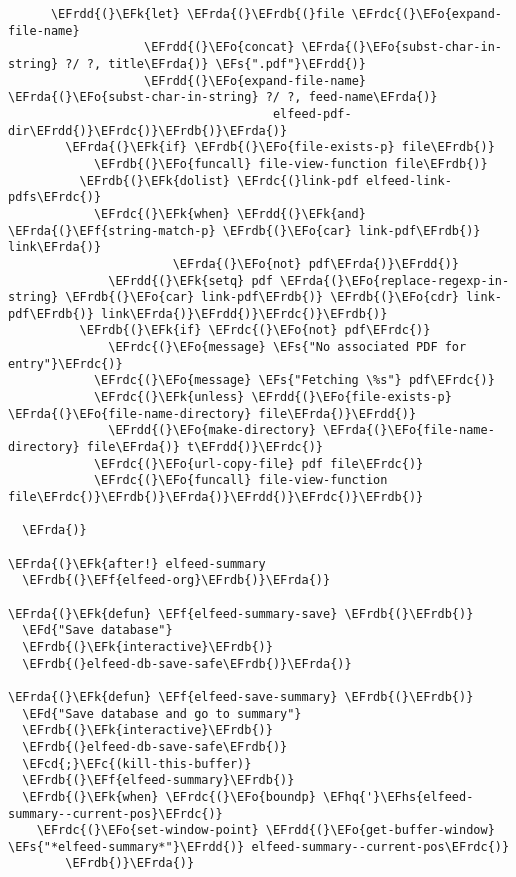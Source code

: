\documentclass[a4wide,10pt]{article}
\newcommand{\EFc}[1]{\textcolor{EFc}{#1}} %
\newcommand{\EFcd}[1]{\textcolor{EFcd}{#1}} %
\newcommand{\EFs}[1]{\textcolor{EFs}{#1}} %
\newcommand{\EFd}[1]{\textcolor{EFd}{#1}} %
\newcommand{\EFk}[1]{\textcolor{EFk}{#1}} %
\newcommand{\EFf}[1]{\textcolor{EFf}{#1}} %
\newcommand{\EFo}[1]{\textcolor{EFo}{#1}} %
\newcommand{\EFhq}[1]{\textcolor{EFhq}{#1}} %
\newcommand{\EFhs}[1]{\textcolor{EFhs}{#1}} %
\newcommand{\EFrda}[1]{\textcolor{EFrda}{#1}} %
\newcommand{\EFrdb}[1]{\textcolor{EFrdb}{#1}} %
\newcommand{\EFrdc}[1]{\textcolor{EFrdc}{#1}} %
\newcommand{\EFrdd}[1]{\textcolor{EFrdd}{#1}} %
\begin{document}
\begin{Code}
\begin{Verbatim}
      \EFrdd{(}\EFk{let} \EFrda{(}\EFrdb{(}file \EFrdc{(}\EFo{expand-file-name}
                   \EFrdd{(}\EFo{concat} \EFrda{(}\EFo{subst-char-in-string} ?/ ?, title\EFrda{)} \EFs{".pdf"}\EFrdd{)}
                   \EFrdd{(}\EFo{expand-file-name} \EFrda{(}\EFo{subst-char-in-string} ?/ ?, feed-name\EFrda{)}
                                     elfeed-pdf-dir\EFrdd{)}\EFrdc{)}\EFrdb{)}\EFrda{)}
        \EFrda{(}\EFk{if} \EFrdb{(}\EFo{file-exists-p} file\EFrdb{)}
            \EFrdb{(}\EFo{funcall} file-view-function file\EFrdb{)}
          \EFrdb{(}\EFk{dolist} \EFrdc{(}link-pdf elfeed-link-pdfs\EFrdc{)}
            \EFrdc{(}\EFk{when} \EFrdd{(}\EFk{and} \EFrda{(}\EFf{string-match-p} \EFrdb{(}\EFo{car} link-pdf\EFrdb{)} link\EFrda{)}
                       \EFrda{(}\EFo{not} pdf\EFrda{)}\EFrdd{)}
              \EFrdd{(}\EFk{setq} pdf \EFrda{(}\EFo{replace-regexp-in-string} \EFrdb{(}\EFo{car} link-pdf\EFrdb{)} \EFrdb{(}\EFo{cdr} link-pdf\EFrdb{)} link\EFrda{)}\EFrdd{)}\EFrdc{)}\EFrdb{)}
          \EFrdb{(}\EFk{if} \EFrdc{(}\EFo{not} pdf\EFrdc{)}
              \EFrdc{(}\EFo{message} \EFs{"No associated PDF for entry"}\EFrdc{)}
            \EFrdc{(}\EFo{message} \EFs{"Fetching \%s"} pdf\EFrdc{)}
            \EFrdc{(}\EFk{unless} \EFrdd{(}\EFo{file-exists-p} \EFrda{(}\EFo{file-name-directory} file\EFrda{)}\EFrdd{)}
              \EFrdd{(}\EFo{make-directory} \EFrda{(}\EFo{file-name-directory} file\EFrda{)} t\EFrdd{)}\EFrdc{)}
            \EFrdc{(}\EFo{url-copy-file} pdf file\EFrdc{)}
            \EFrdc{(}\EFo{funcall} file-view-function file\EFrdc{)}\EFrdb{)}\EFrda{)}\EFrdd{)}\EFrdc{)}\EFrdb{)}

  \EFrda{)}

\EFrda{(}\EFk{after!} elfeed-summary
  \EFrdb{(}\EFf{elfeed-org}\EFrdb{)}\EFrda{)}

\EFrda{(}\EFk{defun} \EFf{elfeed-summary-save} \EFrdb{(}\EFrdb{)}
  \EFd{"Save database"}
  \EFrdb{(}\EFk{interactive}\EFrdb{)}
  \EFrdb{(}elfeed-db-save-safe\EFrdb{)}\EFrda{)}

\EFrda{(}\EFk{defun} \EFf{elfeed-save-summary} \EFrdb{(}\EFrdb{)}
  \EFd{"Save database and go to summary"}
  \EFrdb{(}\EFk{interactive}\EFrdb{)}
  \EFrdb{(}elfeed-db-save-safe\EFrdb{)}
  \EFcd{;}\EFc{(kill-this-buffer)}
  \EFrdb{(}\EFf{elfeed-summary}\EFrdb{)}
  \EFrdb{(}\EFk{when} \EFrdc{(}\EFo{boundp} \EFhq{'}\EFhs{elfeed-summary--current-pos}\EFrdc{)}
    \EFrdc{(}\EFo{set-window-point} \EFrdd{(}\EFo{get-buffer-window} \EFs{"*elfeed-summary*"}\EFrdd{)} elfeed-summary--current-pos\EFrdc{)}
        \EFrdb{)}\EFrda{)}


\end{Verbatim}
\end{Code}
\end{document}
